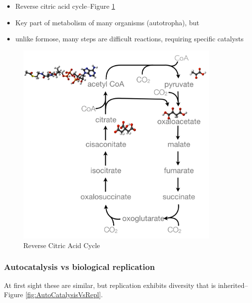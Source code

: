 \documentclass[]{article}
\begin{document}
\begin{itemize}
	\item Reverse citric acid cycle--Figure \ref{fig:ReverseCitricAcidCycle}
	\item Key part of metabolism of many organisms (autotropha), but 
	\item unlike formose, many steps are difficult reactions, requiring specific catalysts
\end{itemize}

\begin{figure}[H]
	\caption{Reverse Citric Acid Cycle}\label{fig:ReverseCitricAcidCycle}
	\includegraphics[width=0.9\textwidth]{ReverseCitricAcidCycle}
\end{figure}

\subsubsection{Autocatalysis vs biological replication}

At first sight these are similar, but replication exhibits diversity that is inherited--Figure \ref{fig:AutoCatalysisVsRepl}.
\end{document}
